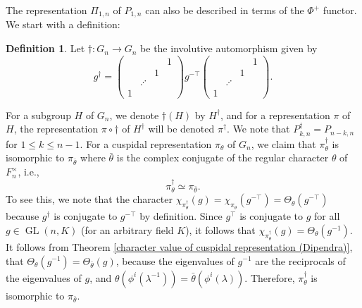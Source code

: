 \documentclass[reqno]{amsart}
\theoremstyle{definition}
\newtheorem{definition}[theorem]{Definition}
\theoremstyle{remark}
\numberwithin{equation}{section}
\DeclareMathOperator{\GL}{GL}
\newcommand{\bbsm}{\left (\begin{smallmatrix}}      \newcommand{\besm}{\end{smallmatrix}\right )}
\begin{document}
The representation $\Pi_{1,n}$ of $P_{1,n}$ can also be described in terms of the $\Phi^+$ functor. We start with  a definition:
\begin{definition}
\label{dagger_def}
Let $\dagger: G_n \to G_n$ be the involutive automorphism  given by 
\[ g^\dagger = \bbsm &&&1 \\
&&1&\\
&\iddots&&\\
1&&&
\besm g^{-\top} \bbsm &&&1 \\
&&1&\\
&\iddots&&\\
1&&&
\besm. \]
\end{definition}
For a subgroup $H$ of $G_n$, we denote $\dagger(H)$ by $H^\dagger$, and for a representation $\pi$ of $H$, the representation $\pi \circ \dagger$ of $H^\dagger$ will be denoted $\pi^\dagger$. We note that $P_{k,n}^\dagger = P_{n-k,n}$ for $1 \leq k \leq n-1$.
For a cuspidal representation $\pi_\theta$ of $G_n$, we claim that $\pi_\theta^\dagger$ is isomorphic to $\pi_{\bar \theta}$
 where $\bar \theta$ is the complex conjugate of the regular character $\theta$ of $F_n^\times$, i.e., 
\begin{equation} \label{eq:pi_theta_dagger}
\pi_\theta^\dagger \simeq \pi_{\bar \theta}.
\end{equation} 
To see this, we note that the character  $\chi_{\pi_\theta^\dagger}(g)=\chi_{\pi_\theta}(g^{-\top})=\Theta_{\theta}(g^{-\top})$ because $g^\dagger$ is conjugate to $g^{-\top}$ by definition. Since $g^\top$ is conjugate to $g$ for all $g \in \GL(n,K)$ (for an arbitrary field $K$), it follows that $\chi_{\pi_\theta^\dagger}(g)=
\Theta_{\theta}(g^{-1})$.
It follows from Theorem \ref{character value of cuspidal representation (Dipendra)}, that $\Theta_{\theta}(g^{-1})=\Theta_{\bar \theta}(g)$, because the eigenvalues of $g^{-1}$ are  the reciprocals of  the eigenvalues of $g$, and $\theta(\phi^i(\lambda^{-1}))=\bar\theta(\phi^i(\lambda))$.  Therefore, $\pi_\theta^\dagger$ is isomorphic to $\pi_{\bar \theta}$.\\
\end{document}
